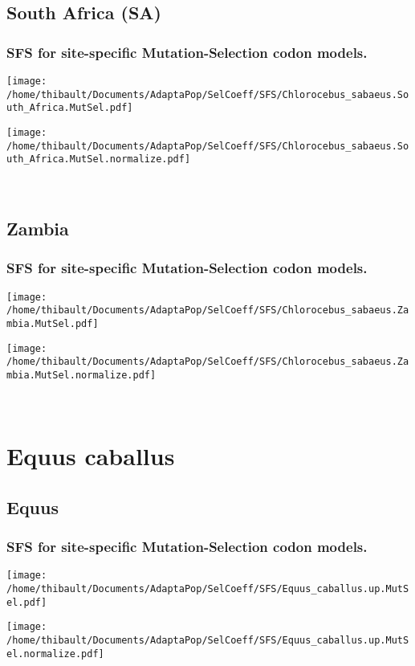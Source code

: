 \subsection{South Africa (SA)} 
 
\subsubsection*{SFS for site-specific Mutation-Selection codon models.} 
\begin{minipage}{0.49\linewidth} 
\texttt{[image: /home/thibault/Documents/AdaptaPop/SelCoeff/SFS/Chlorocebus\_sabaeus.South\_Africa.MutSel.pdf]} 
\end{minipage}
\begin{minipage}{0.49\linewidth}
\texttt{[image: /home/thibault/Documents/AdaptaPop/SelCoeff/SFS/Chlorocebus\_sabaeus.South\_Africa.MutSel.normalize.pdf]} 
\end{minipage}
\\ 
\subsection{Zambia} 
 
\subsubsection*{SFS for site-specific Mutation-Selection codon models.} 
\begin{minipage}{0.49\linewidth} 
\texttt{[image: /home/thibault/Documents/AdaptaPop/SelCoeff/SFS/Chlorocebus\_sabaeus.Zambia.MutSel.pdf]} 
\end{minipage}
\begin{minipage}{0.49\linewidth}
\texttt{[image: /home/thibault/Documents/AdaptaPop/SelCoeff/SFS/Chlorocebus\_sabaeus.Zambia.MutSel.normalize.pdf]} 
\end{minipage}
\\ 
\section{Equus caballus} 
 
\subsection{Equus} 
 
\subsubsection*{SFS for site-specific Mutation-Selection codon models.} 
\begin{minipage}{0.49\linewidth} 
\texttt{[image: /home/thibault/Documents/AdaptaPop/SelCoeff/SFS/Equus\_caballus.up.MutSel.pdf]} 
\end{minipage}
\begin{minipage}{0.49\linewidth}
\texttt{[image: /home/thibault/Documents/AdaptaPop/SelCoeff/SFS/Equus\_caballus.up.MutSel.normalize.pdf]} 
\end{minipage}
\\ 
